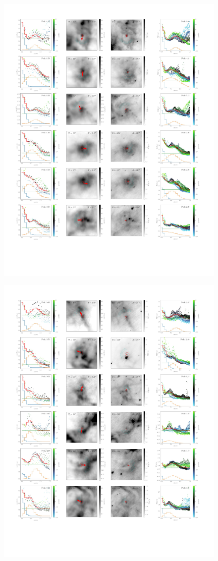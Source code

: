 \documentclass{book}
\begin{document}
\begin{figure}[htb]
    \centering
    \includegraphics[width=1.2\textwidth]{imagenes Chapter 4/ajustes_075324-3.pdf}
\end{figure}
\begin{figure}[htb]
    \centering
    \includegraphics[width=1.2\textwidth]{imagenes Chapter 4/ajustes_075324-4.pdf}
\end{figure}


\end{document}
